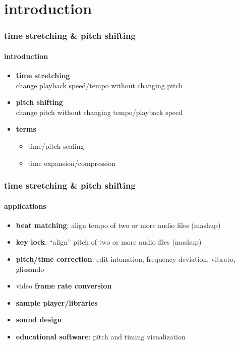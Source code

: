 


\subtitle{Part 22: Time-stretching and Pitch-shifting}


	

\section[intro]{introduction}
\begin{frame}\frametitle{time stretching \& pitch shifting}\framesubtitle{introduction}
	\begin{itemize}
		\item	\textbf{time stretching}\\
			change playback speed/tempo without changing pitch
		\pause
        \bigskip
		\item	\textbf{pitch shifting}\\
			change pitch without changing tempo/playback speed
		\pause
        \bigskip
		\item	\textbf{terms}
            \begin{itemize}
                \item   time/pitch scaling
                \item   time expansion/compression
            \end{itemize}
	\end{itemize}

\end{frame}

\begin{frame}\frametitle{time stretching \& pitch shifting}\framesubtitle{applications}
	\begin{itemize}
		\item	\textbf{beat matching}: align tempo of two or more audio files (mashup)
		\pause
        \smallskip
		\item	\textbf{key lock}: ``align'' pitch of two or more audio files (mashup)
		\pause
        \smallskip
		\item	\textbf{pitch/time correction}: edit intonation, frequency deviation, vibrato, glissando
		\pause
        \smallskip
		\item	video \textbf{frame rate conversion}
		\pause
        \smallskip
		\item	\textbf{sample player/libraries}
		\pause
        \smallskip
		\item	\textbf{sound design}
		\pause
        \smallskip
		\item	\textbf{educational software}: pitch and timing visualization
	\end{itemize}
\end{frame}

